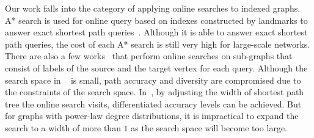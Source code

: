 Our work falls into the category of applying online searches to indexed graphs. A* search is used for online query based on indexes constructed by landmarks to answer exact shortest path queries~\cite{Goldberg:2005:CSP:1070432.1070455}. Although it is able to answer exact shortest path queries, the cost of each A* search is still very high for large-scale networks. There are also a few works~\cite{Gubichev:2010:FAE:1871437.1871503, 6399472} that perform online searches on sub-graphs that consist of labels of the source and the target vertex for each query. Although the search space in ~\cite{Gubichev:2010:FAE:1871437.1871503} is small, path accuracy and diversity are compromised due to the constraints of the search space. In~\cite{6399472}, by adjusting the width of shortest path tree the online search visits, differentiated accuracy levels can be achieved. But for graphs with power-law degree distributions, it is impractical to expand the search to a width of more than $1$ as the search space will become too large.

